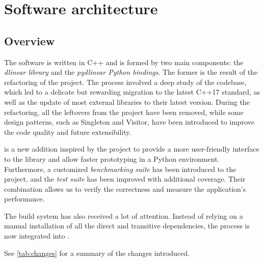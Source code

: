 \chapter{Software architecture}

\section{Overview}

The software is written in C++ and is formed by two main components: the \textit{dlinear library} and the \textit{pydlinear Python bindings}.
The former is the result of the refactoring of the \dlinearfour project.
The process involved a deep study of the codebase, which led to a delicate but rewarding migration to the latest C++17 standard, as well as the update of most external libraries to their latest version.
During the refactoring, all the leftovers from the \dreal project have been removed, while some design patterns, such as Singleton and Visitor, have been introduced to improve the code quality and future extensibility.

\pydlinear is a new addition inspired by the \dreal project to provide a more user-friendly interface to the library and allow faster prototyping in a Python environment.
Furthermore, a customized \textit{benchmarking suite} has been introduced to the project, and the \textit{test suite} has been improved with additional coverage.
Their combination allows us to verify the correctness and measure the application's performance.

The build system has also received a lot of attention.
Instead of relying on a manual installation of all the direct and transitive dependencies, the process is now integrated into \bazel.

See \autoref{tab:changes} for a summary of the changes introduced.

